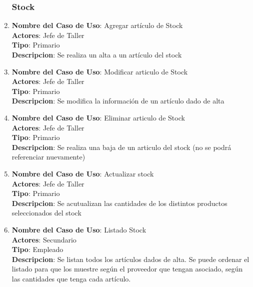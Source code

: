 \documentclass[12pt]{extarticle}
\begin{document}
\begin{spacing}{1.2}
\begin{enumerate}
            \subsubsection{Stock}



            \item 	\textbf{Nombre del Caso de Uso}: Agregar artículo de Stock\\
                    \textbf{Actores}: Jefe de Taller\\
                    \textbf{Tipo}: Primario\\
                    \textbf{Descripcion}: Se realiza un alta a un artículo del stock

            \item 	\textbf{Nombre del Caso de Uso}: Modificar articulo de Stock\\
                    \textbf{Actores}: Jefe de Taller\\
                    \textbf{Tipo}: Primario\\
                    \textbf{Descripcion}: Se modifica la información de un artículo dado de alta

            \item 	\textbf{Nombre del Caso de Uso}: Eliminar articulo de Stock\\
                    \textbf{Actores}: Jefe de Taller\\
                    \textbf{Tipo}: Primario\\
                    \textbf{Descripcion}: Se realiza una baja de un articulo del stock (no se podrá referenciar nuevamente)

            \item 	\textbf{Nombre del Caso de Uso}: Actualizar stock\\
                    \textbf{Actores}: Jefe de Taller\\
                    \textbf{Tipo}: Primario\\
                    \textbf{Descripcion}: Se acutualizan las cantidades de los distintos productos seleccionados del stock

            \item 	\textbf{Nombre del Caso de Uso}: Listado Stock\\
                    \textbf{Actores}: Secundario\\
                    \textbf{Tipo}: Empleado\\
                    \textbf{Descripcion}: Se listan todos los artículos dados de alta. Se puede ordenar el listado para que los muestre según el proveedor que tengan asociado, según las cantidades que tenga cada artículo. 


\end{enumerate}
\end{spacing}
\end{document}
